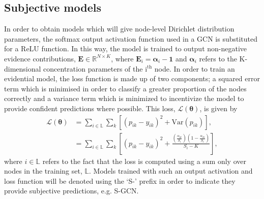 \documentclass[
twocolumn,
]{ceurart}
\begin{document}
\subsection{Subjective models}
In order to obtain models which will give node-level Dirichlet distribution parameters, the softmax output activation function used in a GCN is substituted for a ReLU function.
In this way, the model is trained to output non-negative evidence contributions, $\mathbf{E}\in\mathbb{R}^{N\times K}$, where $\mathbf{E}_{i} = \boldsymbol{\alpha}_{i}-\mathbf{1}$ and $\boldsymbol{\alpha}_{i}$ refers to the K-dimensional concentration parameters of the $\text{i}^\text{th}$ node.
In order to train an evidential model, the loss function is made up of two components; a squared error term which is minimised in order to classify a greater proportion of the nodes correctly and a variance term which is minimized to incentivize the model to provide confident predictions where possible.
This loss, $\mathcal{L}(\boldsymbol{\theta})$, is given by
\begin{equation}
\begin{split}
    \mathcal{L}(\boldsymbol{\theta})&=\sum_{i\in\mathbb{L}}\sum_k \left[(p_{ik}-y_{ik})^2+\text{Var}(p_{ik})\right],\\
    &=\sum_{i\in\mathbb{L}}\sum_k \left[(p_{ik}-y_{ik})^2+\frac{\left(\frac{\alpha_{ik}}{S_i}\right)\left(1-\frac{\alpha_{ik}}{S_i}\right)}{S_i-K}\right],
\end{split}
\label{eq:core_loss}
\end{equation}
where $i\in\mathbb{L}$ refers to the fact that the loss is computed using a sum only over nodes in the training set, $\mathbb{L}$.
Models trained with such an output activation and loss function will be denoted using the `S-' prefix in order to indicate they provide subjective predictions, e.g. S-GCN.
\end{document}
